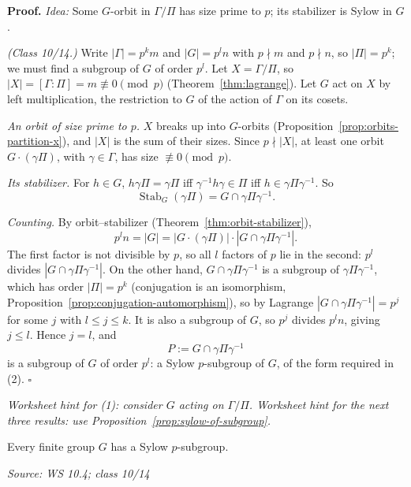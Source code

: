 \documentclass[11pt]{report}
\renewenvironment{proof}[1][Proof]{\noindent\textbf{#1.} }{\hfill$\square$\par\vspace{5pt}}
\newcommand{\srcline}[1]{\par\hfill{\footnotesize\textit{Source: #1}}}
\begin{document}
\begin{proof}
\textit{Idea:} Some $G$-orbit in $\Gamma/\Pi$ has size prime to $p$; its stabilizer is Sylow in $G$.\par
\textit{(Class 10/14.)} Write $|\Gamma| = p^k m$ and $|G| = p^l n$ with $p \nmid m$ and $p \nmid n$, so $|\Pi| = p^k$; we must find a subgroup of $G$ of order $p^l$. Let $X = \Gamma/\Pi$, so $|X| = [\Gamma : \Pi] = m \not\equiv 0 \pmod p$ (Theorem~\ref{thm:lagrange}). Let $G$ act on $X$ by left multiplication, the restriction to $G$ of the action of $\Gamma$ on its cosets.

\emph{An orbit of size prime to $p$.} $X$ breaks up into $G$-orbits (Proposition~\ref{prop:orbits-partition-x}), and $|X|$ is the sum of their sizes. Since $p \nmid |X|$, at least one orbit $G \cdot (\gamma\Pi)$, with $\gamma \in \Gamma$, has size $\not\equiv 0 \pmod p$.

\emph{Its stabilizer.} For $h \in G$, $h\gamma\Pi = \gamma\Pi$ iff $\gamma^{-1}h\gamma \in \Pi$ iff $h \in \gamma\Pi\gamma^{-1}$. So
\[ \operatorname{Stab}_G(\gamma\Pi) = G \cap \gamma\Pi\gamma^{-1}. \]

\emph{Counting.} By orbit--stabilizer (Theorem~\ref{thm:orbit-stabilizer}),
\[ p^l n = |G| = |G \cdot (\gamma\Pi)| \cdot |G \cap \gamma\Pi\gamma^{-1}|. \]
The first factor is not divisible by $p$, so all $l$ factors of $p$ lie in the second: $p^l$ divides $|G \cap \gamma\Pi\gamma^{-1}|$. On the other hand, $G \cap \gamma\Pi\gamma^{-1}$ is a subgroup of $\gamma\Pi\gamma^{-1}$, which has order $|\Pi| = p^k$ (conjugation is an isomorphism, Proposition~\ref{prop:conjugation-automorphism}), so by Lagrange $|G \cap \gamma\Pi\gamma^{-1}| = p^j$ for some $j$ with $l \leq j \leq k$. It is also a subgroup of $G$, so $p^j$ divides $p^l n$, giving $j \leq l$. Hence $j = l$, and
\[ P := G \cap \gamma\Pi\gamma^{-1} \]
is a subgroup of $G$ of order $p^l$: a Sylow $p$-subgroup of $G$, of the form required in (2).
\end{proof}

\textit{Worksheet hint for (1): consider $G$ acting on $\Gamma/\Pi$. Worksheet hint for the next three results: use Proposition~\ref{prop:sylow-of-subgroup}.}

\begin{thmbox}\label{thm:sylow-first}
Every finite group $G$ has a Sylow $p$-subgroup.
\srcline{WS 10.4; class 10/14}
\end{thmbox}
\end{document}
